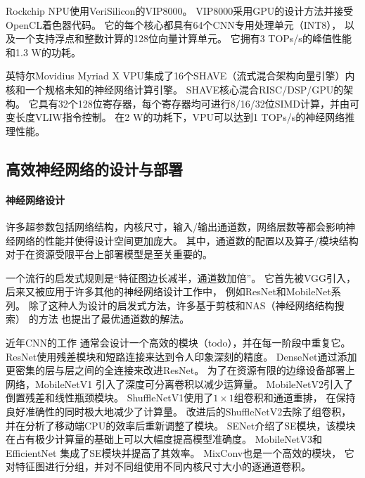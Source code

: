 Rockchip NPU\cite{rk3399pro}使用VeriSilicon的VIP8000。
VIP8000采用GPU的设计方法并接受OpenCL着色器代码。
它的每个核心都具有64个CNN专用处理单元（INT8），
以及一个支持浮点和整数计算的128位向量计算单元。
它拥有3 TOPs/s的峰值性能和1.3 W的功耗。

英特尔Movidius Myriad X VPU集成了16个SHAVE（流式混合架构向量引擎）内核和一个规格未知的神经网络计算引擎。
SHAVE核心\cite{shave}混合RISC/DSP/GPU的架构。
它具有32个128位寄存器，每个寄存器均可进行8/16/32位SIMD计算，并由可变长度VLIW指令控制。
在2 W的功耗下，VPU可以达到1 TOPs/s的神经网络推理性能。

\subsection{高效神经网络的设计与部署}
\label{nn design and deployment}

\paragraph{神经网络设计}
许多超参数包括网络结构，内核尺寸，输入/输出通道数，网络层数等都会影响神经网络的性能并使得设计空间更加庞大。
其中，通道数的配置以及算子/模块结构对于在资源受限平台上部署模型是至关重要的。

一个流行的启发式规则是``特征图边长减半，通道数加倍''。
它首先被VGG\cite{simonyan2014very}引入，
后来又被应用于许多其他的神经网络设计工作中，
例如ResNet\cite{he2016deep}和MobileNet\cite{howard2017mobilenets, sandler2018mobilenetv2}系列。
除了这种人为设计的启发式方法，许多基于剪枝和NAS（神经网络结构搜索）
\cite{he2018amc, lee2019device, liu2019metapruning}的方法
也提出了最优通道数的解法。

近年CNN的工作\cite{he2016deep, ma2018shufflenet, sandler2018mobilenetv2}
通常会设计一个高效的模块（todo），并在每一阶段中重复它。
ResNet\cite{he2016deep}使用残差模块和短路连接来达到令人印象深刻的精度。
DenseNet\cite{huang2017densely}通过添加更密集的层与层之间的全连接来改进ResNet。
为了在资源有限的边缘设备部署上网络，MobileNetV1\cite{howard2017mobilenets}
引入了深度可分离卷积以减少运算量。
MobileNetV2\cite{sandler2018mobilenetv2}引入了倒置残差和线性瓶颈模块。
ShuffleNetV1\cite{zhang2018shufflenet}使用了$1\times 1$组卷积和通道重排，
在保持良好准确性的同时极大地减少了计算量。
改进后的ShuffleNetV2\cite{ma2018shufflenet}去除了组卷积，
并在分析了移动端CPU的效率后重新调整了模块。
SENet\cite{hu2018squeeze}介绍了SE模块，该模块在占有极少计算量的基础上可以大幅度提高模型准确度。
MobileNetV3\cite{howard2019searching}和EfficientNet\cite{tan2019efficientnet}
集成了SE模块并提高了其效率。
MixConv\cite{tan2019mixconv}也是一个高效的模块，
它对特征图进行分组，并对不同组使用不同内核尺寸大小的逐通道卷积。

